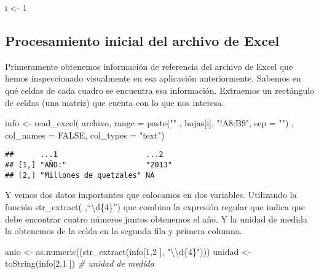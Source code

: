 \documentclass[
]{article}
\newenvironment{Shaded}{\begin{snugshade}}{\end{snugshade}}
\newcommand{\AttributeTok}[1]{\textcolor[rgb]{0.77,0.63,0.00}{#1}}
\newcommand{\CommentTok}[1]{\textcolor[rgb]{0.56,0.35,0.01}{\textit{#1}}}
\newcommand{\ConstantTok}[1]{\textcolor[rgb]{0.00,0.00,0.00}{#1}}
\newcommand{\DecValTok}[1]{\textcolor[rgb]{0.00,0.00,0.81}{#1}}
\newcommand{\FunctionTok}[1]{\textcolor[rgb]{0.00,0.00,0.00}{#1}}
\newcommand{\NormalTok}[1]{#1}
\newcommand{\OtherTok}[1]{\textcolor[rgb]{0.56,0.35,0.01}{#1}}
\newcommand{\SpecialCharTok}[1]{\textcolor[rgb]{0.00,0.00,0.00}{#1}}
\newcommand{\StringTok}[1]{\textcolor[rgb]{0.31,0.60,0.02}{#1}}
\begin{document}
\begin{Shaded}
\begin{Highlighting}[]
\NormalTok{i }\OtherTok{\textless{}{-}} \DecValTok{1}
\end{Highlighting}
\end{Shaded}

\hypertarget{procesamiento-inicial-del-archivo-de-excel}{%
\subsection{Procesamiento inicial del archivo de
Excel}\label{procesamiento-inicial-del-archivo-de-excel}}

Primeramente obtenemos información de referencia del archivo de Excel
que hemos inspeccionado visualmente en esa aplicación anteriormente.
Sabemos en qué celdas de cada cuadro se encuentra esa información.
Extraemos un rectángulo de celdas (una matriz) que cuenta con lo que nos
interesa.

\begin{Shaded}
\begin{Highlighting}[]
\NormalTok{info }\OtherTok{\textless{}{-}} \FunctionTok{read\_excel}\NormalTok{(}
\NormalTok{  archivo,}
  \AttributeTok{range =} \FunctionTok{paste}\NormalTok{(}\StringTok{"\textquotesingle{}"}\NormalTok{ , hojas[i], }\StringTok{"\textquotesingle{}!A8:B9"}\NormalTok{, }\AttributeTok{sep =} \StringTok{""}\NormalTok{) ,}
  \AttributeTok{col\_names =} \ConstantTok{FALSE}\NormalTok{,}
  \AttributeTok{col\_types =} \StringTok{"text"}\NormalTok{)}
\end{Highlighting}
\end{Shaded}

\begin{verbatim}
##      ...1                    ...2  
## [1,] "AÑO:"                  "2013"
## [2,] "Millones de quetzales" NA
\end{verbatim}

Y vemos dos datos importantes que colocamos en dos variables. Utilizando
la función str\_extract( ,``\textbackslash d\{4\}'') que combina la
expresión regular que indica que debe encontrar cuatro números juntos
obtenemos el año. Y la unidad de medida la obtenemos de la celda en la
segunda fila y primera columna.

\begin{Shaded}
\begin{Highlighting}[]
\NormalTok{anio }\OtherTok{\textless{}{-}} \FunctionTok{as.numeric}\NormalTok{((}\FunctionTok{str\_extract}\NormalTok{(info[}\DecValTok{1}\NormalTok{,}\DecValTok{2}\NormalTok{ ], }\StringTok{"}\SpecialCharTok{\textbackslash{}\textbackslash{}}\StringTok{d\{4\}"}\NormalTok{)))}
\NormalTok{unidad }\OtherTok{\textless{}{-}} \FunctionTok{toString}\NormalTok{(info[}\DecValTok{2}\NormalTok{,}\DecValTok{1}\NormalTok{ ]) }\CommentTok{\# unidad de medida}
\end{Highlighting}
\end{Shaded}
\end{document}
